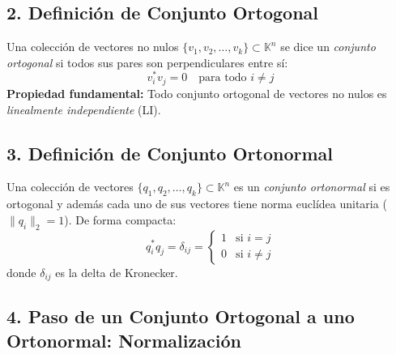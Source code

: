 \documentclass[11pt,a4paper]{article}
\begin{document}
\subsection*{2. Definición de Conjunto Ortogonal}

Una colección de vectores no nulos $\{v_1, v_2, \dots, v_k\} \subset \mathbb{K}^n$ se dice un \emph{conjunto ortogonal} si todos sus pares son perpendiculares entre sí:
\[
v_i^* v_j = 0 \quad \text{para todo } i \neq j
\]
\textbf{Propiedad fundamental:} Todo conjunto ortogonal de vectores no nulos es \emph{linealmente independiente} (LI).

\subsection*{3. Definición de Conjunto Ortonormal}

Una colección de vectores $\{q_1, q_2, \dots, q_k\} \subset \mathbb{K}^n$ es un \emph{conjunto ortonormal} si es ortogonal y además cada uno de sus vectores tiene norma euclídea unitaria ($\|q_i\|_2 = 1$). De forma compacta:
\[
q_i^* q_j = \delta_{ij} = \begin{cases} 1 & \text{si } i = j \\ 0 & \text{si } i \neq j \end{cases}
\]
donde $\delta_{ij}$ es la delta de Kronecker.


\subsection*{4. Paso de un Conjunto Ortogonal a uno Ortonormal: Normalización}
\end{document}
